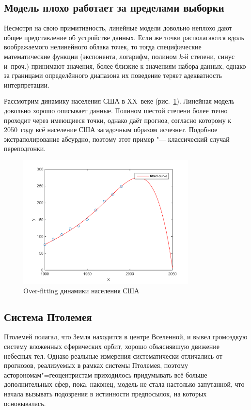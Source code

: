 \documentclass[final,pdftex]{../../template/epsilonj}
\begin{document}
\subsection{Модель плохо работает за пределами выборки}

Несмотря на свою примитивность, линейные модели довольно неплохо дают общее представление об устройстве данных. Если же точки располагаются вдоль воображаемого нелинейного облака точек, то тогда специфические математические функции (экспонента, логарифм, полином $k$-й степени, синус и~проч.) принимают значения, более близкие к значениям набора данных, однако за границами определённого диапазона их поведение теряет адекватность интерпретации.

Рассмотрим динамику населения США в XX~веке (рис.~\ref{fig:usa}). Линейная модель довольно хорошо описывает данные. Полином шестой степени более точно проходит через имеющиеся точки, однако даёт прогноз, согласно которому к 2050~году всё население США загадочным образом исчезнет. Подобное экстраполирование абсурдно, поэтому этот пример "--- классический случай переподгонки.

\begin{figure}[htbp]
	\centering
	\includegraphics[width=9cm]{overfit.png}
	\caption{Over-fitting динамики населения США} \label{fig:usa}
\end{figure}

\subsection{Система Птолемея}

Птолемей полагал, что Земля находится в центре Вселенной, и вывел громоздкую систему вложенных сферических орбит, хорошо объяснявшую движение небесных тел. Однако реальные измерения систематически отличались от прогнозов, реализуемых в рамках системы Птолемея, поэтому асторономам"=геоцентристам приходилось придумывать всё больше дополнительных сфер, пока, наконец, модель не стала настолько запутанной, что начала вызывать подозрения в истинности предпосылок, на которых основывалась.
\end{document}
